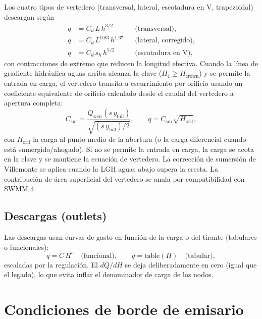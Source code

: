 \documentclass[11pt,a4paper]{article}
\begin{document}
Los cuatro tipos de vertedero (transversal, lateral, escotadura en V,
trapezoidal) descargan según
\begin{equation}
  \begin{aligned}
    q &= C_d\,L\,h^{3/2} &&\text{(transversal)},\\
    q &= C_d\,L^{0.83}\,h^{1.67} &&\text{(lateral, corregido)},\\
    q &= C_d\,s_h\,h^{5/2} &&\text{(escotadura en V)},
  \end{aligned}
\end{equation}
con contracciones de extremo que reducen la longitud efectiva. Cuando la línea
de gradiente hidráulica aguas arriba alcanza la clave ($H_1 \ge
H_{\mathrm{crown}}$) y se permite la entrada en carga, el vertedero transita a
escurrimiento por orificio usando un coeficiente equivalente de orificio
calculado desde el caudal del vertedero a apertura completa:
\begin{equation}
  C_{\mathrm{sur}} = \frac{Q_{\mathrm{weir}}(s\,y_{\mathrm{full}})}
    {\sqrt{(s\,y_{\mathrm{full}})/2}},
  \qquad
  q = C_{\mathrm{sur}}\sqrt{H_{\mathrm{orif}}},
\end{equation}
con $H_{\mathrm{orif}}$ la carga al punto medio de la abertura (o la carga
diferencial cuando está sumergido/ahogado). Si no se permite la entrada en
carga, la carga se acota en la clave y se mantiene la ecuación de vertedero. La
corrección de sumersión de Villemonte se aplica cuando la LGH aguas abajo
supera la cresta. La contribución de área superficial del vertedero se anula
por compatibilidad con SWMM 4.

\subsection{Descargas (outlets)}

Las descargas usan curvas de gasto en función de la carga o del tirante
(tabulares o funcionales):
\begin{equation}
  q = C\,H^{e} \quad\text{(funcional)}, \qquad
  q = \mathrm{table}(H) \quad\text{(tabular)},
\end{equation}
escaladas por la regulación. El $dQ/dH$ se deja deliberadamente en cero
(igual que el legado), lo que evita inflar el denominador de carga de los
nodos.

\section{Condiciones de borde de emisario}
\label{sec:outfall}
\end{document}
